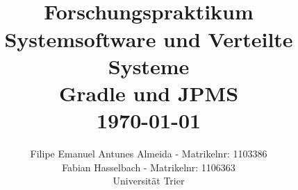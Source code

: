 
\title{ \normalsize \textsc{}
	\\ [3.0cm]
	\LARGE \textbf{Forschungspraktikum}   \\
	\LARGE \textbf{Systemsoftware und Verteilte Systeme}  \\ [0.2cm]
	\Large Gradle und JPMS	\\ [0.5cm]
	\normalsize \today \vspace*{5\baselineskip}
}

\date{}

\author{
	Filipe Emanuel Antunes Almeida - Matrikelnr: 1103386  \\
	Fabian Hasselbach - Matrikelnr: 1106363  \\ [0.5cm]
	Universität Trier 
}

\maketitle
\newpage
\tableofcontents	
\newpage

\setcounter{page}{1} 		%